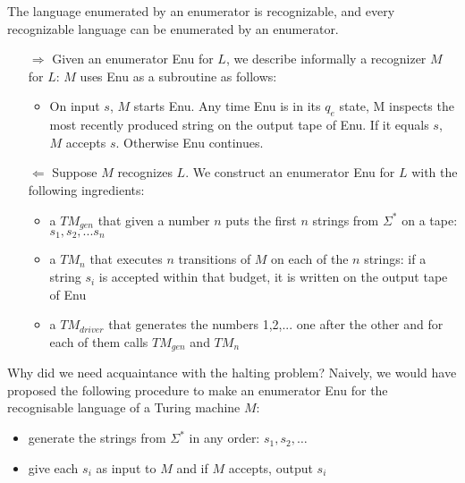 \begin{theorem}
The language enumerated by an enumerator is recognizable, and every
recognizable language can be enumerated by an enumerator.
\end{theorem}
\begin{proof*}
\begin{itemize}
	\item[$\Rightarrow$] 
	Given an enumerator Enu for $L$, we describe informally a recognizer
	  $M$ for $L$: $M$ uses Enu as a subroutine as follows:
	\begin{itemize}
	\item On input $s$, $M$ starts Enu. Any time Enu is in its $q_e$ state, M
	inspects the most recently produced string on the output tape of
	Enu. If it equals $s$, $M$ accepts $s$. Otherwise Enu continues.
	\end{itemize}

	\item[$\Leftarrow$] 
	Suppose $M$ recognizes $L$. We construct an enumerator Enu for $L$ with the following ingredients:
	
	\begin{itemize}
	\item
	a $TM_{gen}$ that given a number $n$ puts the first $n$
	strings from $\Sigma^*$ on a tape: $s_1, s_2, ... s_n$
	
	\item
	a $TM_n$ that executes $n$ transitions
	of $M$ on each of the $n$ strings: if a string $s_i$ is accepted within that budget, it is written
	on the output tape of Enu
	
	\item
	a $TM_{driver}$ that generates the numbers 1,2,... one after the
	other and for each of them calls $TM_{gen}$ and $TM_n$\vspace{-2em}
	\end{itemize}
\end{itemize}
\end{proof*}

Why did we need acquaintance with the halting problem? Naively, we
would have proposed the following procedure to make an enumerator Enu
for the recognisable language of a Turing machine $M$:

\begin{itemize}
\item
generate the strings from $\Sigma^*$ in any order:
$s_1, s_2, \hdots$

\item
give each $s_i$ as input to $M$ and if $M$ accepts, output $s_i$
\end{itemize}

